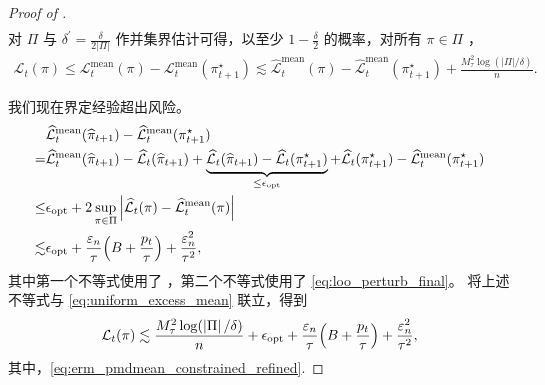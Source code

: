 \documentclass{article}
\theoremstyle{plain}
\theoremstyle{definition}
\theoremstyle{remark}
\newcommand{\abs}[1]{\left|#1\right|}
\begin{document}
\begin{proof}[Proof of ]
\begin{align*}
    \end{align*}
    对 $\Pi$ 与 $\delta^\prime=\frac{\delta}{2\abs{\Pi}}$ 作并集界估计可得，以至少 $1-\frac{\delta}{2}$ 的概率，对所有 $\pi\in\Pi$ ，
    \begin{align}\label{eq:uniform_excess_mean}
        \mathcal{L}_t(\pi)
        \leq\mathcal{L}^{\mathrm{mean}}_t(\pi)-\mathcal{L}^{\mathrm{mean}}_t(\pi^\star_{t+1})
        \lesssim
        \widehat{\mathcal{L}}^{\mathrm{mean}}_t(\pi)-\widehat{\mathcal{L}}^{\mathrm{mean}}_t(\pi^\star_{t+1})
        +\frac{M_\tau^2\log(\abs{\Pi}/\delta)}{n}.
    \end{align}

    我们现在界定经验超出风险。 
    \begin{align*}
        &\widehat{\mathcal{L}}^{\mathrm{mean}}_t(\widehat{\pi}_{t+1}) -\widehat{\mathcal{L}}^{\mathrm{mean}}_t(\pi^\star_{t+1})\\
        =&\widehat{\mathcal{L}}^{\mathrm{mean}}_t(\widehat{\pi}_{t+1}) 
        - \widehat{\mathcal{L}}_t(\widehat{\pi}_{t+1}) + \underbrace{\widehat{\mathcal{L}}_t(\widehat{\pi}_{t+1})  - \widehat{\mathcal{L}}_t(\pi^\star_{t+1})}_{\leq \epsilon_\mathrm{opt}} + \widehat{\mathcal{L}}_t(\pi^\star_{t+1}) 
        -\widehat{\mathcal{L}}^{\mathrm{mean}}_t(\pi^\star_{t+1})\\
        \leq & 
        \epsilon_{\mathrm{opt}}
        +2\sup_{\pi\in\Pi}\abs{\widehat{\mathcal{L}}_t(\pi)-\widehat{\mathcal{L}}^{\mathrm{mean}}_t(\pi)}\\
        \lesssim& \epsilon_{\mathrm{opt}}
        +\frac{\varepsilon_n}{\tau}\Bigl(B+\frac{p_t}{\tau}\Bigr)
        +\frac{\varepsilon_n^2}{\tau^2},
    \end{align*}
    其中第一个不等式使用了 ，第二个不等式使用了 \eqref{eq:loo_perturb_final}。  
将上述不等式与 \eqref{eq:uniform_excess_mean} 联立，得到 
    \begin{align*}
        \mathcal{L}_t(\pi)
        \lesssim \frac{M_\tau^2\log(\abs{\Pi}/\delta)}{n} + \epsilon_{\mathrm{opt}}
        +\frac{\varepsilon_n}{\tau}\Bigl(B+\frac{p_t}{\tau}\Bigr)
        +\frac{\varepsilon_n^2}{\tau^2},
    \end{align*}
    其中，\eqref{eq:erm_pmdmean_constrained_refined}. 
\end{proof}
\end{document}
